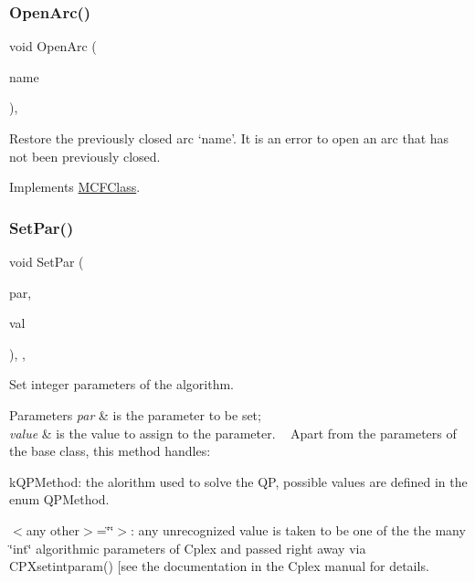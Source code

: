 \subsubsection{\texorpdfstring{Open\+Arc()}{OpenArc()}}
{\footnotesize\ttfamily void Open\+Arc (\begin{DoxyParamCaption}\item[{\mbox{\hyperlink{class_m_c_f_class_a76aaabb20535c51a2752b93f6c38fe54}{c\+Index}}}]{name }\end{DoxyParamCaption})\hspace{0.3cm}{\ttfamily [override]}, {\ttfamily [virtual]}}

Restore the previously closed arc `name'. It is an error to open an arc that has not been previously closed. 

Implements \mbox{\hyperlink{class_m_c_f_class_ab902a23d1c9520a22b79de5d451c3348}{M\+C\+F\+Class}}.

\mbox{\label{class_m_c_f_cplex_a12105bbd99b8b7ad7efae3bb0c222b3c}} 
\subsubsection{\texorpdfstring{Set\+Par()}{SetPar()}\hspace{0.1cm}{\footnotesize\ttfamily [1/2]}}
{\footnotesize\ttfamily void Set\+Par (\begin{DoxyParamCaption}\item[{int}]{par,  }\item[{int}]{val }\end{DoxyParamCaption})\hspace{0.3cm}{\ttfamily [inline]}, {\ttfamily [override]}, {\ttfamily [virtual]}}

Set integer parameters of the algorithm.


\begin{DoxyParams}{Parameters}
{\em par} & is the parameter to be set;\\
\hline
{\em value} & is the value to assign to the parameter. ~\newline
 Apart from the parameters of the base class, this method handles\+:\\
\hline
\end{DoxyParams}

\begin{DoxyItemize}
\item k\+Q\+P\+Method\+: the alorithm used to solve the QP, possible values are defined in the enum Q\+P\+Method.
\item $<$any other$>$=\char`\"{}\char`\"{}$>$\+: any unrecognized value is taken to be one of the the many \char`\"{}int\char`\"{} algorithmic parameters of Cplex and passed right away via C\+P\+Xsetintparam() \mbox{[}see the documentation in the Cplex manual for details. 
\end{DoxyItemize}

